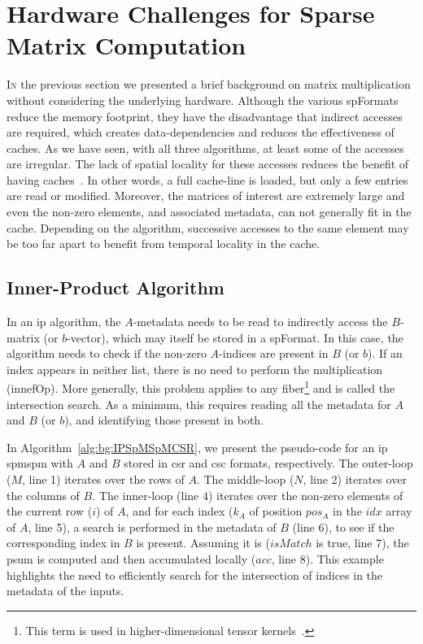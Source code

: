 
\section{Hardware Challenges for Sparse Matrix Computation}
\label{sec:bg:hwchallenges}

\lettrine{I}{n} the previous section we presented a brief background on matrix multiplication without considering the underlying hardware.
Although the various \glspl{spFormat} reduce the memory footprint, they have the disadvantage that indirect accesses are required, which creates data-dependencies and reduces the effectiveness of caches.
As we have seen, with all three algorithms, at least some of the accesses are irregular.
The lack of spatial locality for these accesses reduces the benefit of having caches~\cite{Wulf1995_MemoryWall, Matam2012}.
In other words, a full cache-line is loaded, but only a few entries are read or modified.
Moreover, the matrices of interest are extremely large and even the non-zero elements, and associated \gls{metadata}, can not generally fit in the cache.
Depending on the algorithm, successive accesses to the same element may be too far apart to benefit from temporal locality in the cache.

\subsection{Inner-Product Algorithm}

In an \acrshort{ip} algorithm, the $A$-\gls{metadata} needs to be read to indirectly access the $B$-matrix (or $b$-vector), which may itself be stored in a \gls{spFormat}.
In this case, the algorithm needs to check if the non-zero $A$-indices are present in $B$ (or $b$).
If an index appears in neither list, there is no need to perform the multiplication (\gls{innefOp}).
More generally, this problem applies to any \gls{fiber}\footnote{This term is used in higher-dimensional tensor kernels~\cite{Srivastava2020_Tensaurus}.} and is called the \gls{intersection} search.
As a minimum, this requires reading all the \gls{metadata} for $A$ and $B$ (or $b$), and identifying those present in both.

In Algorithm~\ref{alg:bg:IPSpMSpMCSR}, we present the pseudo-code for an \acrfull{ip} \acrshort{spmspm} with $A$ and $B$ stored in \acrshort{csr} and \acrshort{csc} formats, respectively.
The outer-loop ($M$, line 1) iterates over the rows of $A$.
The middle-loop ($N$, line 2) iterates over the columns of $B$.
The inner-loop (line 4) iterates over the non-zero elements of the current row ($i$) of $A$, and for each index ($k_A$ of position $pos_A$ in the $idx$ array of $A$, line 5), a search is performed in the \gls{metadata} of $B$ (line 6), to see if the corresponding index in $B$ is present.
Assuming it is ($\mathit{isMatch}$ is true, line 7), the \gls{psum} is computed and then accumulated locally ($acc$, line 8).
This example highlights the need to efficiently search for the \gls{intersection} of indices in the \gls{metadata} of the inputs.

